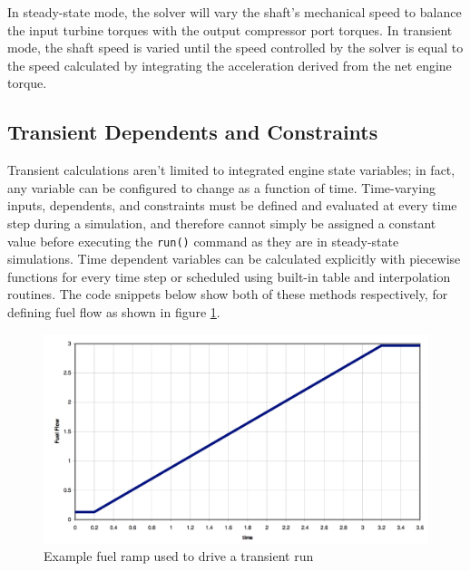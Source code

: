 \documentclass[heading.tex]{subfiles}
\begin{document}
 \begin{adjustwidth}{-1cm}{-1cm}
 \inputminted[]{c++}{code/shaft.mdl}
 \end{adjustwidth} 

In steady-state mode, the solver will vary the shaft's mechanical speed to
balance the input turbine torques with the output compressor port torques.
In transient mode, the shaft speed is varied until the speed
controlled by the solver is equal to the speed calculated by integrating
the acceleration derived from the net engine torque.

\subsection{Transient Dependents and Constraints}

Transient calculations aren't limited to integrated engine state variables;
in fact, any variable can be configured to change as a function of time.
Time-varying inputs, dependents, and constraints must be defined and evaluated at every time
step during a simulation, and therefore cannot simply be
assigned a constant value before executing the \texttt{run()} command as they are in steady-state simulations.
Time dependent variables can be calculated explicitly with
piecewise functions for every time step or scheduled using built-in table and interpolation routines.
The code snippets below show both of these methods respectively, for defining fuel flow as shown in figure \ref{f:ramp}.

\begin{figure}[H]
\centering
\includegraphics[width=1.0\textwidth]{images/fuelRamp}
\caption{Example fuel ramp used to drive a transient run}
\label{f:ramp}
\end{figure}

\begin{adjustwidth}{-1cm}{-1cm}
 \inputminted[]{c++}{code/rampFn}
 \end{adjustwidth} 
 
\end{document}
